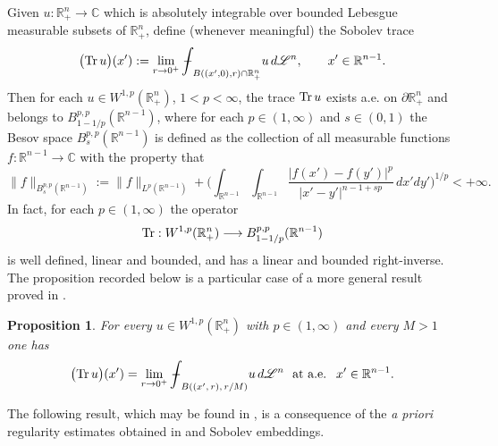 \documentclass[11pt,reqno]{amsart}
\newcommand{\meanint}{{\int{\mkern-19mu}-}}
\numberwithin{equation}{section}
\newtheorem{proposition}[theorem]{Proposition}
\theoremstyle{remark}
\begin{document}
Given $u:{\mathbb{R}}^n_{+}\to{\mathbb{C}}$ which is absolutely integrable over 
bounded Lebesgue measurable subsets of ${\mathbb{R}}^n_{+}$, define (whenever meaningful) the Sobolev 
trace
%
\begin{equation}\label{Veri-S2TG.3}
\big({\rm Tr}\,u\big)(x'):=\lim\limits_{r\to 0^{+}}\meanint_{B((x',0),r)\cap{\mathbb{R}}^n_{+}}
u\,d{\mathscr{L}}^n,\qquad x'\in{\mathbb{R}}^{n-1}. 
\end{equation}
%
Then for each $u\in W^{1,p}({\mathbb{R}}^n_{+})$, $1<p<\infty$, 
the trace ${\rm Tr}\,u$ exists a.e. on $\partial{\mathbb{R}}^n_{+}$ and 
belongs to $B^{p,p}_{1-1/p}({\mathbb{R}}^{n-1})$, 
where for each $p\in(1,\infty)$ and $s\in(0,1)$ the Besov space 
$B^{p,p}_s({\mathbb{R}}^{n-1})$ is defined as the collection of all measurable 
functions $f:{\mathbb{R}}^{n-1}\to{\mathbb{C}}$ with the property that
%
\begin{equation}\label{Veri-S2TG.4}
\|f\|_{B^{p,p}_s({\mathbb{R}}^{n-1})}:=\|f\|_{L^p({\mathbb{R}}^{n-1})}+\Big(\int_{{\mathbb{R}}^{n-1}}
\int_{{\mathbb{R}}^{n-1}}\frac{|f(x')-f(y')|^p}{|x'-y'|^{n-1+sp}}\,dx'dy'\Big)^{1/p}<+\infty.
\end{equation}
%
In fact, for each $p\in(1,\infty)$ the operator 
%
\begin{equation}\label{Veri-S2TG.5}
{\rm Tr}:W^{1,p}({\mathbb{R}}^n_{+})
\longrightarrow B^{p,p}_{1-1/p}({\mathbb{R}}^{n-1})
\end{equation}
%
is well defined, linear and bounded, and has a linear and bounded right-inverse. 
The proposition recorded below is a particular case of a more general result proved in \cite[Theorem~5.6, p.\,4372]{BMMM}.

\begin{proposition}\label{HgUV954.Ki-5}
For every $u\in W^{1,p}({\mathbb{R}}^n_{+})$ with $p\in(1,\infty)$ and every $M>1$ one has
%
\begin{equation}\label{Veri-S2TG.6}
\big({\rm Tr}\,u\big)(x')=
\lim\limits_{r\to 0^{+}}\meanint_{B((x',\,r),\,r/M)}u\,d{\mathscr{L}}^n
\,\,\text{ at a.e. }\,\,x'\in{\mathbb{R}}^{n-1}. 
\end{equation}
\end{proposition}

The following result, which may be found in \cite[Corollary~2.4]{MaMiSh}, is a 
consequence of the {\it a priori} regularity estimates obtained in \cite{ADNII}
and Sobolev embeddings.
\end{document}
